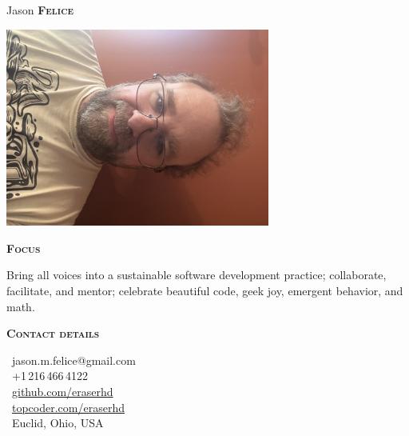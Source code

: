 \documentclass[11pt, letterpaper]{article}
\newcommand{\headleft}[1]{\vspace*{3ex}\textsc{\textbf{#1}}\par%
    \vspace*{-1.5ex}\hrulefill\par\vspace*{0.7ex}}
\begin{document}
\setlength{\topskip}{0pt}
\setlength{\parindent}{0pt}
\setlength{\parskip}{0pt}
\setlength{\fboxsep}{0pt}
\pagestyle{empty}
\raggedbottom

\begin{minipage}[t]{0.33\textwidth} %
\colorbox{cvblue}{\begin{minipage}[t][5mm][t]{\textwidth}\null\hfill\null\end{minipage}}

\vspace{-.25ex} %
\colorbox{cvblue!90}{\color{white}  %
\textwidth\relax%
\begin{minipage}[t][\dimexpr\textheight-5mm\relax][t]{0.82\textwidth}
\raggedright
\vspace*{2.5ex}

\null\hfill\Huge{Jason \textbf{\textsc{Felice}}}\normalsize\hfill\null

\null\hfill\includegraphics[width=0.65\textwidth]{profile.jpg}\hfill\null

\vspace*{0.5ex} %

\headleft{Focus}

Bring all voices into a sustainable software development practice;
collaborate, facilitate, and mentor; celebrate beautiful code, geek joy,
emergent behavior, and math.

\headleft{Contact details}
\makebox[1em][c]{\faAt}\ jason.m.felice@gmail.com \\[0.5ex]
\makebox[1em][c]{\faPhone}\ +1\,216\,466\,4122 \\[0.5ex]
\makebox[1em][c]{\faGithub}\ \href{https://github.com/eraserhd}{github.com/eraserhd} \\[0.5ex]
\makebox[1em][c]{\faCode}\ \href{https://www.topcoder.com/members/eraserhd}{topcoder.com/eraserhd} \\[0.5ex]
\makebox[1em][c]{\faMapMarker}\ Euclid, Ohio, USA


\end{minipage}}
\end{minipage}
\end{document}
